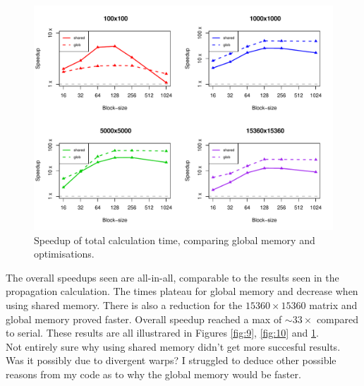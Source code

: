 \documentclass[12pt]{article}
\begin{document}
\begin{figure}
	\centering
	\includegraphics[width=\linewidth]{../plots/tot_globvshared.pdf}
	\caption{Speedup of total calculation time, comparing global memory and optimisations.}
	\label{fig:11}
\end{figure}
The overall speedups seen are all-in-all, comparable to the results seen in the propagation calculation. The times plateau for global memory and decrease when using shared memory. There is also a reduction for the $15360\times15360$ matrix and global memory proved faster. Overall speedup reached a max of $\sim33\times$ compared to serial. These results are all illustrared in Figures \ref{fig:9}, \ref{fig:10} and \ref{fig:11}.\\
Not entirely sure why using shared memory didn't get more succesful results. Was it possibly due to divergent warps? I struggled to deduce other possible reasons from my code as to why the global memory would be faster.
\end{document}
